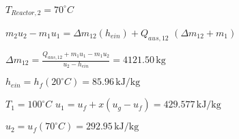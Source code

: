 \( T_{Reactor,2} = 70^\circ C \)  

\( m_{2} u_{2} - m_{1} u_{1} = \Delta m_{12} (h_{ein}) + Q_{aus,12} \)  
\( (\Delta m_{12} + m_{1}) \)  

\( \Delta m_{12} = \frac{Q_{aus,12} + m_{1} u_{1} - m_{1} u_{2}}{u_{2} - h_{ein}} = 4121.50 \, \text{kg} \)  

\( h_{ein} = h_{f}(20^\circ C) = 85.96 \, \text{kJ/kg} \)  

\( T_{1} = 100^\circ C \)  
\( u_{1} = u_{f} + x (u_{g} - u_{f}) = 429.577 \, \text{kJ/kg} \)  

\( u_{2} = u_{f}(70^\circ C) = 292.95 \, \text{kJ/kg} \)